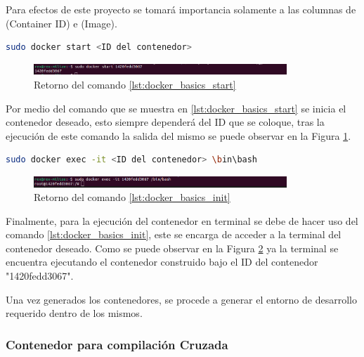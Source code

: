 Para efectos de este proyecto se tomará importancia solamente a las columnas de (Container ID) e (Image).

\begin{lstlisting}[language=bash, caption={Iniciar un contenedor, Docker}, label=lst:docker_basics_start]
    sudo docker start <ID del contenedor>
\end{lstlisting}

\begin{figure}[h!]
    \centering
    \includegraphics[width=0.85\textwidth]{fig/especifico_2/retornos_de_comandos/sudo_docker_start.png}
    \caption{Retorno del comando \ref{lst:docker_basics_start}}
    \label{fig:sudo_docker_start}
\end{figure}

Por medio del comando que se muestra en \ref{lst:docker_basics_start} se inicia el contenedor deseado, esto siempre dependerá del ID que se coloque, tras la ejecución de este comando la salida del mismo se puede observar en la Figura \ref{fig:sudo_docker_start}.

\begin{lstlisting}[language=bash, caption={Ingresar a un contenedor, Docker}, label=lst:docker_basics_init]
    sudo docker exec -it <ID del contenedor> \bin\bash
\end{lstlisting}

\begin{figure}[h!]
    \centering
    \includegraphics[width=0.85\textwidth]{fig/especifico_2/retornos_de_comandos/sudo_docker_init.png}
    \caption{Retorno del comando \ref{lst:docker_basics_init}}
    \label{fig:sudo_docker_init}
\end{figure}

Finalmente, para la ejecución del contenedor en terminal se debe de hacer uso del comando \ref{lst:docker_basics_init}, este se encarga de acceder a la terminal del contenedor deseado. Como se puede observar en la Figura \ref{fig:sudo_docker_init} ya la terminal se encuentra ejecutando el contenedor construido bajo el ID del contenedor "1420fedd3067".

Una vez generados los contenedores, se procede a generar el entorno de desarrollo requerido dentro de los mismos.

\subsubsection{Contenedor para compilación Cruzada}\label{subsec:generacion_entorno_xcompile}

